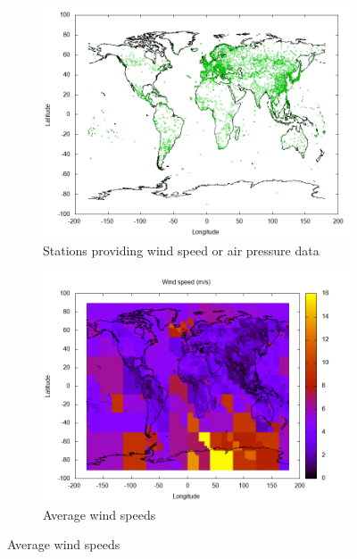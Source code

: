 \begin{figure}
\centering
\begin{subfigure}[b]{1.0\textwidth}
	\includegraphics[width=\textwidth]{img/cloud/stations}
	\caption{Stations providing wind speed or air pressure data}
\end{subfigure}

\begin{subfigure}[b]{1.0\textwidth}
	\includegraphics[width=\textwidth]{img/cloud/wind-speed}
	\caption{Average wind speeds}
\end{subfigure}
\end{figure}
\clearpage
